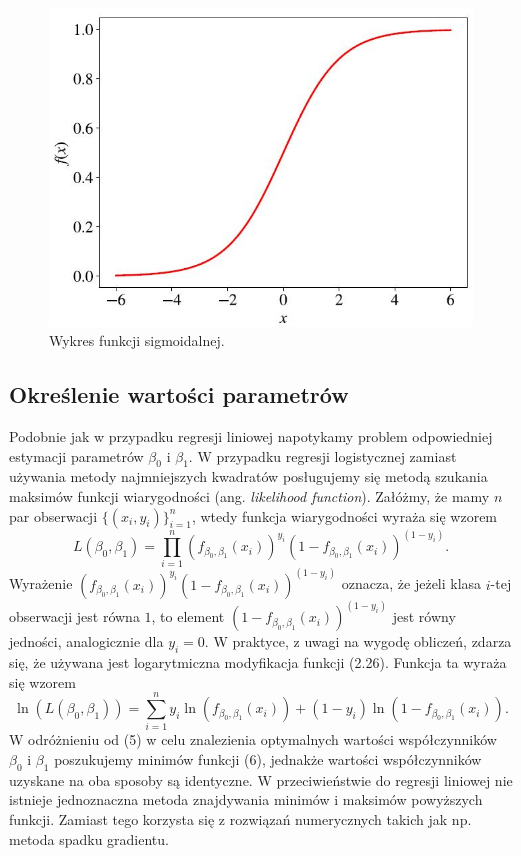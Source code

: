 \documentclass[a4paper]{article}
\begin{document}
\begin{figure}[ht]
    \centering
    \includegraphics[width=300 pt, height = 200 pt]{SIGMOID_FUNC_HUNDRED.JPG}
    \caption{Wykres funkcji sigmoidalnej.}
    \label{r(2.5)}
\end{figure}

\newpage
\subsection{Określenie wartości parametrów}
Podobnie jak w przypadku regresji liniowej napotykamy problem odpowiedniej estymacji parametrów $\beta_0$ i $\beta_1$. W przypadku regresji logistycznej zamiast używania metody najmniejszych kwadratów posługujemy się metodą szukania maksimów funkcji wiarygodności (ang. \textit{likelihood function}). Załóżmy, że mamy $n$ par obserwacji $\{(x_i, y_i)\}_{i=1}^n$, wtedy funkcja wiarygodności wyraża się wzorem
\begin{equation}\label{(2.26)}
    L(\beta_0, \beta_1) = \prod_{i =  1}^n{\left(f_{\beta_0,\beta_1}(x_i)\right)^{y_i}\left(1-f_{\beta_0,\beta_1}(x_i)\right)^{(1-y_i)}}.
\end{equation}
Wyrażenie $(f_{\beta_0,\beta_1}(x_i))^{y_i}(1-f_{\beta_0,\beta_1}(x_i))^{(1-y_i)}$ oznacza, że jeżeli klasa $i$-tej obserwacji jest równa $1$, to element $(1-f_{\beta_0,\beta_1}(x_i))^{(1-y_i)}$ jest równy jedności, analogicznie dla $y_i = 0$.
W praktyce, z uwagi na wygodę obliczeń,  zdarza się, że używana jest logarytmiczna modyfikacja funkcji {(2.26)}. Funkcja ta wyraża się wzorem
\begin{equation}\label{(2.27)}
    \ln\left(L(\beta_0, \beta_1)\right) = \sum\limits_{i=1}^n{y_i\ln\left(f_{\beta_0,\beta_1}(x_i)\right)+ (1-y_i)\ln\left(1-f_{\beta_0,\beta_1}(x_i)\right)}.
\end{equation}
W odróżnieniu od {(5)} w celu znalezienia optymalnych wartości współczynników $\beta_0$ i $\beta_1$ poszukujemy minimów funkcji {(6)}, jednakże wartości współczynników uzyskane na oba sposoby są identyczne. W przeciwieństwie do regresji liniowej nie istnieje jednoznaczna metoda znajdywania minimów i maksimów powyższych funkcji. Zamiast tego korzysta się z rozwiązań numerycznych takich jak np. metoda spadku gradientu.
\end{document}

